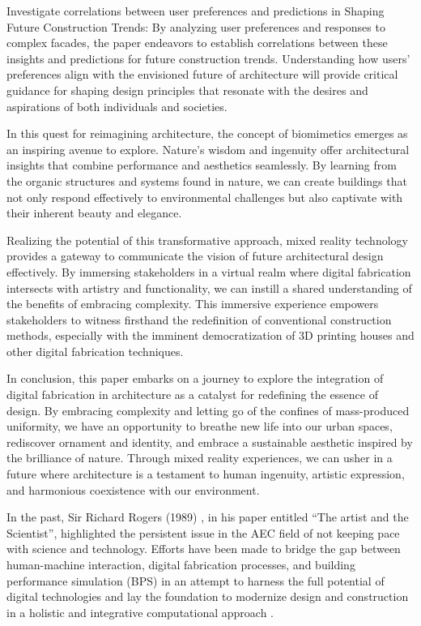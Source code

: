 Investigate correlations between user preferences and predictions in Shaping Future Construction Trends: By analyzing user preferences and responses to complex facades, the paper endeavors to establish correlations between these insights and predictions for future construction trends. Understanding how users' preferences align with the envisioned future of architecture will provide critical guidance for shaping design principles that resonate with the desires and aspirations of both individuals and societies.

In this quest for reimagining architecture, the concept of biomimetics emerges as an inspiring avenue to explore. Nature's wisdom and ingenuity offer architectural insights that combine performance and aesthetics seamlessly. By learning from the organic structures and systems found in nature, we can create buildings that not only respond effectively to environmental challenges but also captivate with their inherent beauty and elegance.

Realizing the potential of this transformative approach, mixed reality technology provides a gateway to communicate the vision of future architectural design effectively. By immersing stakeholders in a virtual realm where digital fabrication intersects with artistry and functionality, we can instill a shared understanding of the benefits of embracing complexity. This immersive experience empowers stakeholders to witness firsthand the redefinition of conventional construction methods, especially with the imminent democratization of 3D printing houses and other digital fabrication techniques.

In conclusion, this paper embarks on a journey to explore the integration of digital fabrication in architecture as a catalyst for redefining the essence of design.
By embracing complexity and letting go of the confines of mass-produced uniformity, we have an opportunity to breathe new life into our urban spaces, rediscover ornament and identity, and embrace a sustainable aesthetic inspired by the brilliance of nature.
Through mixed reality experiences, we can usher in a future where architecture is a testament to human ingenuity, artistic expression, and harmonious coexistence with our environment.

In the past, Sir Richard Rogers (1989) \cite{Rogers1989}, in his paper entitled “The artist and the Scientist”, highlighted the persistent issue in the AEC field of not keeping pace with science and technology. Efforts have been made to bridge the gap between human-machine interaction, digital fabrication processes, and building performance simulation (BPS) \cite{Naboni2015} in an attempt to harness the full potential of digital technologies and lay the foundation to modernize design and construction in a holistic and integrative computational approach \cite{Knippers2021}. 


